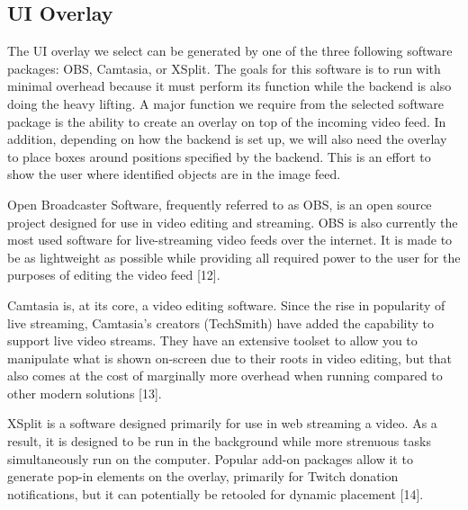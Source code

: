 \documentclass[onecolumn, draftclsnofoot,10pt, compsoc]{IEEEtran}
\begin{document}
\newpage
\subsection{UI Overlay} %

The UI overlay we select can be generated by one of the three following software packages:  OBS, Camtasia, or XSplit.  The goals for this software is to run with minimal overhead because it must perform its function while the backend is also doing the heavy lifting.  A major function we require from the selected software package is the ability to create an overlay on top of the incoming video feed.  In addition, depending on how the backend is set up, we will also need the overlay to place boxes around positions specified by the backend.  This is an effort to show the user where identified objects are in the image feed.

Open Broadcaster Software, frequently referred to as OBS, is an open source project designed for use in video editing and streaming.  OBS is also currently the most used software for live-streaming video feeds over the internet.  It is made to be as lightweight as possible while providing all required power to the user for the purposes of editing the video feed [12].

Camtasia is, at its core, a video editing software.  Since the rise in popularity of live streaming, Camtasia's creators (TechSmith) have added the capability to support live video streams.  They have an extensive toolset to allow you to manipulate what is shown on-screen due to their roots in video editing, but that also comes at the cost of marginally more overhead when running compared to other modern solutions [13].

XSplit is a software designed primarily  for use in web streaming a video.  As a result, it is designed to be run in the background while more strenuous tasks simultaneously run on the computer.  Popular add-on packages allow it to generate pop-in elements on the overlay, primarily  for Twitch donation notifications, but it can potentially be retooled for dynamic placement [14].
\end{document}
